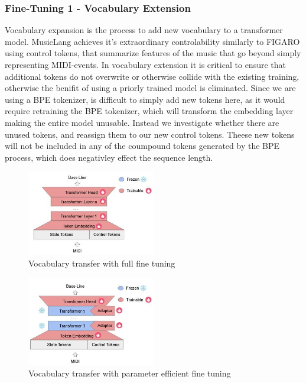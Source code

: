 \subsubsection{Fine-Tuning 1 - Vocabulary Extension}

Vocabulary expansion is the process to add new vocabulary to a transformer model. MusicLang achieves it's extraordinary controlability similarly to FIGARO \cite{Rütte_figaro_2023} using control tokens, that summarize features of the music that go beyond simply representing MIDI-events. In vocabulary extension it is critical to ensure that additional tokens do not overwrite or otherwise collide with the existing training, otherwise the benifit of using a priorly trained model is eliminated. Since we are using a BPE tokenizer, is difficult to simply add new tokens here, as it would require retraining the BPE tokenizer, which will transform the embedding layer making the entire model unusable. Instead we investigate whether there are unused tokens, and reassign them to our new control tokens. Theese new tokens will not be included in any of the coumpound tokens generated by the BPE process, which does negativley effect the sequence length.

\begin{figure}[H]
    \centering
    \includegraphics[width=0.5\textwidth]{IMAGES/full_ft.jpg}
    \caption{Vocabulary transfer with full fine tuning}
    \label{fig:vocabtrans1}
\end{figure}

\begin{figure}[H]
    \centering
    \includegraphics[width=0.5\textwidth]{IMAGES/vocab_lora_ft.jpg} 
    \caption{Vocabulary transfer with parameter efficient fine tuning}
    \label{fig:vocabtrans2}
\end{figure}

